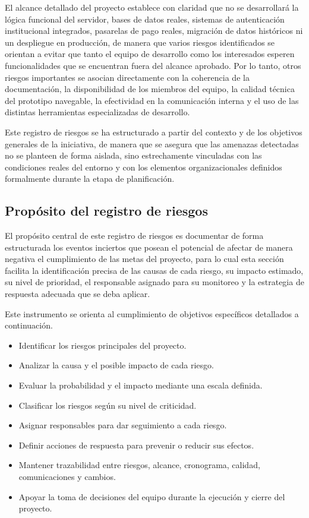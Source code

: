 \documentclass[11pt,spanish]{article}
\begin{document}
El alcance detallado del proyecto establece con claridad que no se desarrollará la lógica funcional del servidor, bases de datos reales, sistemas de autenticación institucional integrados, pasarelas de pago reales, migración de datos históricos ni un despliegue en producción, de manera que varios riesgos identificados se orientan a evitar que tanto el equipo de desarrollo como los interesados esperen funcionalidades que se encuentran fuera del alcance aprobado. Por lo tanto, otros riesgos importantes se asocian directamente con la coherencia de la documentación, la disponibilidad de los miembros del equipo, la calidad técnica del prototipo navegable, la efectividad en la comunicación interna y el uso de las distintas herramientas especializadas de desarrollo.

Este registro de riesgos se ha estructurado a partir del contexto y de los objetivos generales de la iniciativa, de manera que se asegura que las amenazas detectadas no se planteen de forma aislada, sino estrechamente vinculadas con las condiciones reales del entorno y con los elementos organizacionales definidos formalmente durante la etapa de planificación.

\subsection{Propósito del registro de riesgos}

El propósito central de este registro de riesgos es documentar de forma estructurada los eventos inciertos que posean el potencial de afectar de manera negativa el cumplimiento de las metas del proyecto, para lo cual esta sección facilita la identificación precisa de las causas de cada riesgo, su impacto estimado, su nivel de prioridad, el responsable asignado para su monitoreo y la estrategia de respuesta adecuada que se deba aplicar.

Este instrumento se orienta al cumplimiento de objetivos específicos detallados a continuación.

\begin{itemize}[leftmargin=*, label={\textbullet}]
    \item Identificar los riesgos principales del proyecto.
    \item Analizar la causa y el posible impacto de cada riesgo.
    \item Evaluar la probabilidad y el impacto mediante una escala definida.
    \item Clasificar los riesgos según su nivel de criticidad.
    \item Asignar responsables para dar seguimiento a cada riesgo.
    \item Definir acciones de respuesta para prevenir o reducir sus efectos.
    \item Mantener trazabilidad entre riesgos, alcance, cronograma, calidad, comunicaciones y cambios.
    \item Apoyar la toma de decisiones del equipo durante la ejecución y cierre del proyecto.
\end{itemize}
\end{document}
